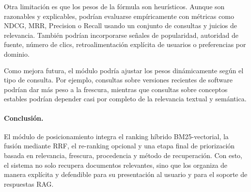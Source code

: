\documentclass[11pt]{article}
\begin{document}
Otra limitación es que los pesos de la fórmula son heurísticos. Aunque son razonables y
explicables, podrían evaluarse empíricamente con métricas como NDCG, MRR, Precision o Recall
usando un conjunto de consultas y juicios de relevancia. También podrían incorporarse señales de
popularidad, autoridad de fuente, número de clics, retroalimentación explícita de usuarios o
preferencias por dominio.

Como mejora futura, el módulo podría ajustar los pesos dinámicamente según el tipo de consulta.
Por ejemplo, consultas sobre versiones recientes de software podrían dar más peso a la frescura,
mientras que consultas sobre conceptos estables podrían depender casi por completo de la
relevancia textual y semántica.

\paragraph{Conclusión.}
El módulo de posicionamiento integra el ranking híbrido BM25-vectorial, la fusión mediante RRF,
el re-ranking opcional y una etapa final de priorización basada en relevancia, frescura,
procedencia y método de recuperación. Con esto, el sistema no solo recupera documentos
relevantes, sino que los organiza de manera explícita y defendible para su presentación al
usuario y para el soporte de respuestas RAG.
\end{document}
